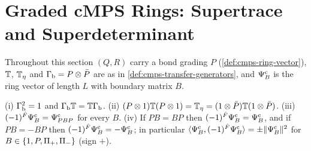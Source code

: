 
\section{Graded cMPS Rings: Supertrace and Superdeterminant}
\label{sec:cmps-twisted-supertrace}

Throughout this section $(Q,R)$ carry a bond grading $P$ (\cref{def:cmps-ring-vector}),
$\mathbb T$, $\mathbb T_\eta$ and $\Gamma_{\mathrm b}=P\otimes\bar P$ are as in \cref{def:cmps-transfer-generators}, and
$\Psi^{\mathrm c}_{B}$ is the ring vector of length $L$ with boundary matrix $B$.

\begin{proposition}
\label{prop:cmps-graded-parity}
(i) $\Gamma_{\mathrm b}^2=1$ and $\Gamma_{\mathrm b}\mathbb T=\mathbb T\Gamma_{\mathrm b}$. (ii) $(P\otimes1)\mathbb T(P\otimes1)=\mathbb T_\eta=
(1\otimes\bar P)\mathbb T(1\otimes\bar P)$. (iii) $(-1)^{\hat F}\Psi^{\mathrm c}_{B}=\Psi^{\mathrm c}_{PBP}$ for every $B$. (iv) If
$PB=BP$ then $(-1)^{\hat F}\Psi^{\mathrm c}_{B}=\Psi^{\mathrm c}_{B}$, and if $PB=-BP$ then $(-1)^{\hat F}\Psi^{\mathrm c}_{B}=-\Psi^{\mathrm c}_{B}$; in
particular $\langle\Psi^{\mathrm c}_{B},(-1)^{\hat F}\Psi^{\mathrm c}_{B}\rangle=\pm\|\Psi^{\mathrm c}_{B}\|^2$ for
$B\in\{1,P,\Pi_{+},\Pi_{-}\}$ (sign $+$).
\end{proposition}

